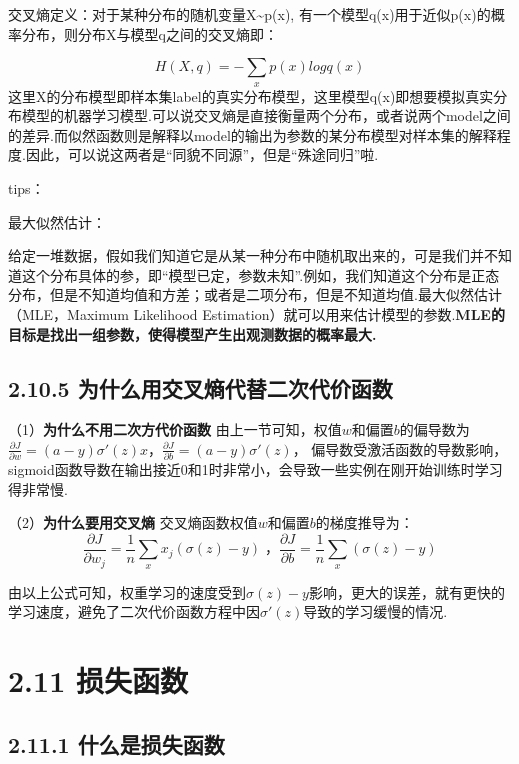 交叉熵定义：对于某种分布的随机变量X\textasciitilde{}p(x),
有一个模型q(x)用于近似p(x)的概率分布，则分布X与模型q之间的交叉熵即：

\[
H(X,q)=-\sum_{x}p(x)logq(x)
\]
这里X的分布模型即样本集label的真实分布模型，这里模型q(x)即想要模拟真实分布模型的机器学习模型.可以说交叉熵是直接衡量两个分布，或者说两个model之间的差异.而似然函数则是解释以model的输出为参数的某分布模型对样本集的解释程度.因此，可以说这两者是``同貌不同源''，但是``殊途同归''啦.

tips：

最大似然估计：

给定一堆数据，假如我们知道它是从某一种分布中随机取出来的，可是我们并不知道这个分布具体的参，即``模型已定，参数未知''.例如，我们知道这个分布是正态分布，但是不知道均值和方差；或者是二项分布，但是不知道均值.最大似然估计（MLE，Maximum
Likelihood
Estimation）就可以用来估计模型的参数.\textbf{MLE的目标是找出一组参数，使得模型产生出观测数据的概率最大.}

\subsection{2.10.5
为什么用交叉熵代替二次代价函数}\label{ux4e3aux4ec0ux4e48ux7528ux4ea4ux53c9ux71b5ux4ee3ux66ffux4e8cux6b21ux4ee3ux4ef7ux51fdux6570}

（1）\textbf{为什么不用二次方代价函数}
由上一节可知，权值$w$和偏置$b$的偏导数为$\frac{\partial J}{\partial w}=(a-y)\sigma'(z)x$，$\frac{\partial J}{\partial b}=(a-y)\sigma'(z)$，
偏导数受激活函数的导数影响，sigmoid函数导数在输出接近0和1时非常小，会导致一些实例在刚开始训练时学习得非常慢.

（2）\textbf{为什么要用交叉熵}
交叉熵函数权值$w$和偏置$b$的梯度推导为： \[
\frac{\partial J}{\partial w_j}=\frac{1}{n}\sum_{x}x_j(\sigma{(z)}-y)\;，
\frac{\partial J}{\partial b}=\frac{1}{n}\sum_{x}(\sigma{(z)}-y)
\]

由以上公式可知，权重学习的速度受到$\sigma{(z)}-y$影响，更大的误差，就有更快的学习速度，避免了二次代价函数方程中因$\sigma'{(z)}$导致的学习缓慢的情况.

\section{2.11 损失函数}\label{ux635fux5931ux51fdux6570}

\subsection{2.11.1
什么是损失函数}\label{ux4ec0ux4e48ux662fux635fux5931ux51fdux6570}

